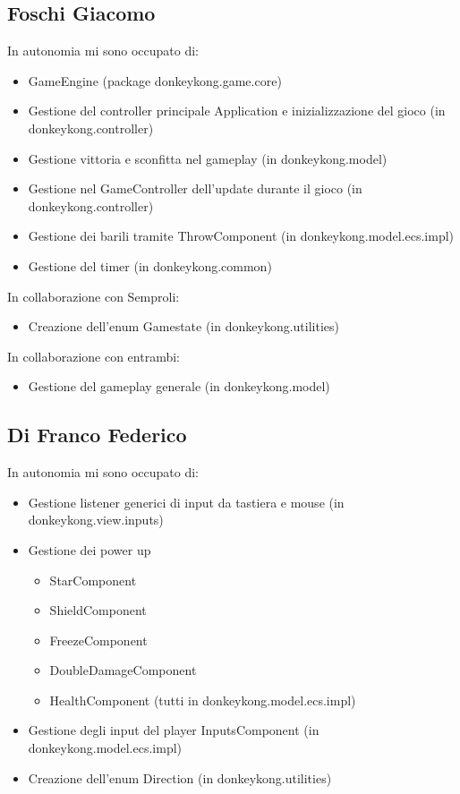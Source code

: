 \documentclass[a4paper,12pt]{report}
\begin{document}
\subsection*{Foschi Giacomo}
In autonomia mi sono occupato di:
\begin{itemize}
    \item GameEngine (package donkeykong.game.core)
    \item Gestione del controller principale Application e inizializzazione del gioco (in donkeykong.controller)
    \item Gestione vittoria e sconfitta nel gameplay (in donkeykong.model)
    \item Gestione nel GameController dell’update durante il gioco (in donkeykong.controller)
    \item Gestione dei barili tramite ThrowComponent (in donkeykong.model.ecs.impl)
    \item Gestione del timer (in donkeykong.common)
\end{itemize}

In collaborazione con Semproli:
\begin{itemize}
    \item Creazione dell’enum Gamestate (in donkeykong.utilities)
\end{itemize}

In collaborazione con entrambi:
\begin{itemize}
    \item Gestione del gameplay generale (in donkeykong.model)
\end{itemize}

\subsection*{Di Franco Federico}
In autonomia mi sono occupato di:
\begin{itemize}
    \item Gestione listener generici di input da tastiera e mouse (in donkeykong.view.inputs)
    \item Gestione dei power up
    \begin{itemize}
        \item StarComponent
        \item ShieldComponent
        \item FreezeComponent
        \item DoubleDamageComponent
        \item HealthComponent (tutti in donkeykong.model.ecs.impl)
    \end{itemize}
    \item Gestione degli input del player InputsComponent (in donkeykong.model.ecs.impl)
    \item Creazione dell’enum Direction (in donkeykong.utilities)
\end{itemize}
\end{document}

